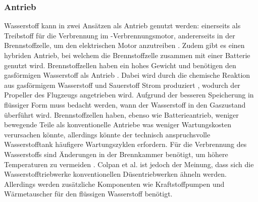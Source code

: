 \subsubsection{Antrieb}
Wasserstoff kann in zwei Ansätzen als Antrieb genutzt werden: 
einerseits als Treibstoff für die Verbrennung im -Verbrennungsmotor,
andererseits in der Brennstoffzelle, um den elektrischen Motor anzutreiben \cite{sky2020hydrogen}. 
Zudem gibt es einen hybriden Antrieb, bei welchem die Brennstoffzelle zusammen mit einer Batterie genutzt wird.
%
Brennstoffzellen haben ein hohes Gewicht \cite{hepperle2012electric} und 
benötigen den gasförmigen Wasserstoff als Antrieb \cite{colpan2022fuel}.
Dabei wird durch die chemische Reaktion aus gasförmigem Wasserstoff  und Sauerstoff  Strom produziert \cite{dalmia2022powering}, 
wodurch der Propeller des Flugzeugs angetrieben wird. Aufgrund der besseren Speicherung in flüssiger Form muss bedacht werden, wann der Wasserstoff in den Gaszustand überführt wird. 
Brennstoffzellen haben, ebenso wie Batterieantrieb, weniger bewegende Teile als konventionelle Antriebe \cite{dalmia2022powering} was weniger Wartungskosten verursachen könnte,
allerdings könnte der technisch anspruchsvolle Wasserstofftank häufigere Wartungszyklen erfordern.
%
%
%
%
Für die Verbrennung des Wasserstoffs sind Änderungen in der Brennkammer benötigt, 
um höhere Temperaturen zu vermeiden \cite{khandelwal2013hydrogen}.
Colpan et al. \cite{colpan2022fuel} ist jedoch der Meinung, 
dass sich die Wasserstofftriebwerke konventionellen Düsentriebwerken ähneln werden. 
Allerdings werden zusätzliche Komponenten wie Kraftstoffpumpen und Wärmetauscher 
für den flüssigen Wasserstoff benötigt.
%
